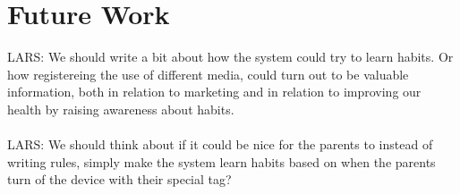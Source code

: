 \chapter{Future Work}
LARS: We should write a bit about how the system could try to learn habits. Or how registereing the use of different media, could turn out to be valuable information, both in relation to marketing and in relation to improving our health by raising awareness about habits.\\
\\
LARS: We should think about if it could be nice for the parents to instead of writing rules, simply make the system learn habits based on when the parents turn of the device with their special tag?